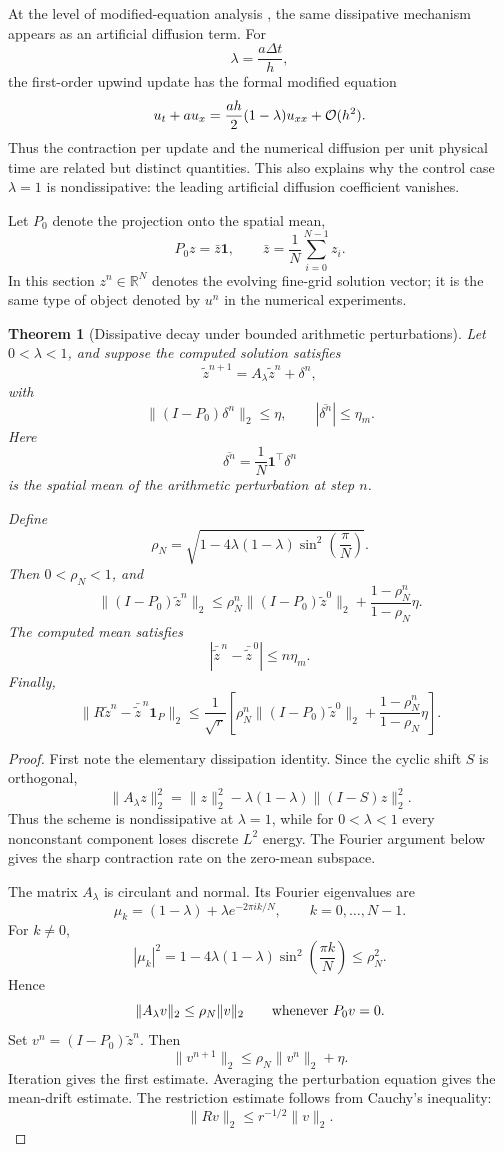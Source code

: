 \documentclass[preprint,12pt]{elsarticle}
\theoremstyle{plain}
\newtheorem{theorem}{Theorem}
\theoremstyle{remark}
\theoremstyle{definition}
\begin{document}
At the level of modified-equation analysis
\cite{warming1974,harten1983,tadmor1987,MargolinRider}, the same dissipative mechanism
appears as an artificial diffusion term.  For
\[
  \lambda=\frac{a\Delta t}{h},
\]
the first-order upwind update has the formal modified equation
\[
  u_t+a u_x
  =
  \frac{ah}{2}(1-\lambda)u_{xx}
  +
  {\cal O}(h^2).
\]
Thus the contraction per update and the numerical diffusion per unit
physical time are related but distinct quantities.  This also explains why
the control case \(\lambda=1\) is nondissipative: the leading artificial
diffusion coefficient vanishes.

Let \(P_0\) denote the projection onto the spatial mean,
\[
  P_0 z=\bar z\mathbf 1,
  \qquad
  \bar z=\frac1N\sum_{i=0}^{N-1}z_i.
\]
In this section \(z^n\in\mathbb R^N\) denotes the evolving fine-grid solution
vector; it is the same type of object denoted by \(u^n\) in the numerical
experiments.

\begin{theorem}[Dissipative decay under bounded arithmetic perturbations]
\label{thm:erasure}
Let \(0<\lambda<1\), and suppose the computed solution satisfies
\[
  \tilde z^{n+1}
  =
  A_\lambda \tilde z^n+\delta^n,
\]
with
\[
  \|(I-P_0)\delta^n\|_2\le\eta,
  \qquad
  |\overline{\delta^n}|\le\eta_m.
\]
Here
\[
  \overline{\delta^n}
  =
  \frac1N\mathbf 1^\top\delta^n
\]
is the spatial mean of the arithmetic perturbation at step \(n\).

Define
\[
  \rho_N
  =
  \sqrt{
  1-4\lambda(1-\lambda)\sin^2\left(\frac{\pi}{N}\right)
  }.
\]
Then \(0<\rho_N<1\), and
\[
  \|(I-P_0)\tilde z^n\|_2
  \le
  \rho_N^n\|(I-P_0)\tilde z^0\|_2
  +
  \frac{1-\rho_N^n}{1-\rho_N}\eta .
\]
The computed mean satisfies
\[
  |\bar{\tilde z}^{\,n}-\bar{\tilde z}^{\,0}|
  \le
  n\eta_m .
\]
Finally,
\[
  \|R\tilde z^n-\bar{\tilde z}^{\,n}\mathbf 1_P\|_2
  \le
  \frac1{\sqrt r}
  \left[
  \rho_N^n\|(I-P_0)\tilde z^0\|_2
  +
  \frac{1-\rho_N^n}{1-\rho_N}\eta
  \right].
\]
\end{theorem}

\begin{proof}
First note the elementary dissipation identity.  Since the cyclic shift
\(S\) is orthogonal,
\[
  \|A_\lambda z\|_2^2
  =
  \|z\|_2^2
  -
  \lambda(1-\lambda)\|(I-S)z\|_2^2.
\]
Thus the scheme is nondissipative at \(\lambda=1\), while for \(0<\lambda<1\) every nonconstant component loses discrete \(L^2\) energy.
The Fourier argument below gives the sharp contraction rate on the zero-mean subspace.

The matrix \(A_\lambda\) is circulant and normal.  Its Fourier eigenvalues
are
\[
  \mu_k=(1-\lambda)+\lambda e^{-2\pi i k/N},
  \qquad
  k=0,\ldots,N-1.
\]
For \(k\ne0\),
\[
  |\mu_k|^2
  =
  1-4\lambda(1-\lambda)\sin^2\left(\frac{\pi k}{N}\right)
  \le
  \rho_N^2.
\]
Hence
\[
  \|A_\lambda v\|_2\le \rho_N\|v\|_2
  \qquad
  \hbox{whenever }P_0 v=0.
\]
Set \(v^n=(I-P_0)\tilde z^n\).  Then
\[
  \|v^{n+1}\|_2
  \le
  \rho_N\|v^n\|_2+\eta .
\]
Iteration gives the first estimate.  Averaging the perturbation equation
gives the mean-drift estimate.  The restriction estimate follows from
Cauchy's inequality:
\[
  \|Rv\|_2\le r^{-1/2}\|v\|_2 .
\]
\end{proof}
\end{document}
